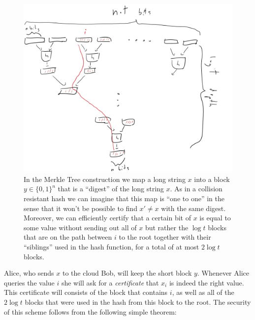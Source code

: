 \begin{figure}
\centering
\includegraphics[width=\textwidth, height=0.25\paperheight, keepaspectratio]{../figure/merkle-tree.jpg}
\caption{In the Merkle Tree construction we map a long string \(x\) into
a block \(y\in\{0,1\}^n\) that is a ``digest'' of the long string \(x\).
As in a collision resistant hash we can imagine that this map is ``one
to one'' in the sense that it won't be possible to find \(x'\neq x\)
with the same digest. Moreover, we can efficiently certify that a
certain bit of \(x\) is equal to some value without sending out all of
\(x\) but rather the \(\log t\) blocks that are on the path between
\(i\) to the root together with their ``siblings'' used in the hash
function, for a total of at most \(2\log t\) blocks.}
\label{merkletreefig}
\end{figure}

Alice, who sends \(x\) to the cloud Bob, will keep the short block
\(y\). Whenever Alice queries the value \(i\) she will ask for a
\emph{certificate} that \(x_i\) is indeed the right value. This
certificate will consists of the block that contains \(i\), as well as
all of the \(2\log t\) blocks that were used in the hash from this block
to the root. The security of this scheme follows from the following
simple theorem:

\hypertarget{merkletreefig}{}

